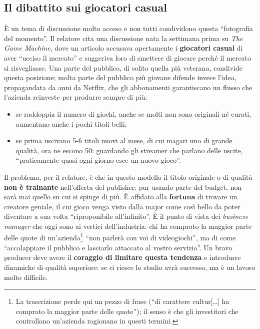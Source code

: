 \subsection{Il dibattito sui giocatori casual}

È un tema di discussione molto acceso e non tutti condividono questa
``fotografia del momento''. Il relatore cita una discussione nata la settimana
prima su \emph{The Game Machine}, dove un articolo accusava apertamente i
\textbf{giocatori casual} di aver ``ucciso il mercato'' e suggeriva loro di
smettere di giocare perché il mercato si risvegliasse. Una parte del pubblico,
di solito quella più veterana, condivide questa posizione; molta parte del
pubblico più giovane difende invece l'idea, propagandata da anni da Netflix, che
gli abbonamenti garantiscano un flusso che l'azienda reinveste per produrre
sempre di più:
\begin{itemize}
  \item se raddoppia il numero di giochi, anche se molti non sono originali né
        curati, aumentano anche i pochi titoli belli;
  \item se prima uscivano 5-6 titoli nuovi al mese, di cui magari uno di grande
        qualità, ora ne escono 50: guardando gli streamer che parlano delle
        uscite, ``praticamente quasi ogni giorno esce un nuovo gioco''.
\end{itemize}
Il problema, per il relatore, è che in questo modello il titolo originale o di
qualità \textbf{non è trainante} nell'offerta del publisher: pur usando parte del
budget, non sarà mai quello su cui si spinge di più. È affidato alla
\textbf{fortuna} di trovare un creatore geniale, il cui gioco venga visto dalla
major come così bello da poter diventare a sua volta ``riproponibile
all'infinito''. È il punto di vista dei \emph{business manager} che oggi sono ai
vertici dell'industria: chi ha comprato la maggior parte delle quote di
un'azienda\footnote{La trascrizione perde qui un pezzo di frase (``di carattere
cultur{[}\dots{]} ha comprato la maggior parte delle quote''); il senso è che
gli investitori che controllano un'azienda ragionano in questi termini.}
``non parlerà con voi di videogiochi'', ma di come ``accalappiare il pubblico e
lasciarlo attaccato al vostro servizio''. Un bravo producer deve avere il
\textbf{coraggio di limitare questa tendenza} e introdurre dinamiche di qualità
superiore: se ci riesce lo studio avrà successo, ma è un lavoro molto difficile.

